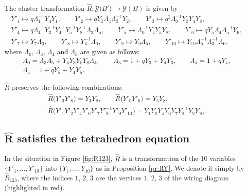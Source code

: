 \begin{Proposition}\label{pr:RY}
The cluster transformation $\widehat{R}\colon \mathcal{Y}\bigl(B'\bigr) \rightarrow \mathcal{Y}(B)$ is given by
\begin{gather*}
Y'_1 \mapsto q\Lambda^{-1}_4Y_4Y_1,\qquad
Y'_2 \mapsto qY_3\Lambda_4\Lambda^{-1}_3Y_2,
\qquad
Y'_3 \mapsto q^2 \Lambda^{-1}_0Y_3Y_4Y_8,
\\
Y'_4 \mapsto q\Lambda^{-1}_4Y^{-1}_3Y^{-1}_4Y^{-1}_5Y^{-1}_8\Lambda_3\Lambda_5,
\qquad
Y'_5 \mapsto \Lambda^{-1}_0 Y_4Y_5Y_8,
\qquad
Y'_6 \mapsto q Y_5 \Lambda_4\Lambda^{-1}_5Y_6,
\\
Y'_7 \mapsto Y_7\Lambda_3,
\qquad
Y'_8 \mapsto Y^{-1}_4\Lambda_0,
\qquad
Y'_9 \mapsto Y_9\Lambda_5,
\qquad
Y'_{10} \mapsto Y_{10}\Lambda^{-1}_5\Lambda^{-1}_3\Lambda_0,
\end{gather*}
where $\Lambda_0$, $\Lambda_3$, $\Lambda_4$ and $\Lambda_5$ are given
as follows:
\begin{gather*}
\Lambda_0 = \Lambda_3\Lambda_5 + Y_4Y_3Y_5Y_8\Lambda_4,\qquad
\Lambda_3 = 1+qY_3+Y_4Y_3,\qquad
\Lambda_4 = 1 + q Y_4, \\
\Lambda_5 = 1+qY_5+Y_4Y_5.
\end{gather*}
\end{Proposition}

\begin{Remark}\label{re:c2}
$\widehat{R}$ preserves the following combinations:
\begin{gather*}
\widehat{R}\bigl(Y'_3Y'_8\bigr) = Y_3Y_8,
\qquad
\widehat{R}\bigl(Y'_5Y'_8\bigr) = Y_5Y_8,
\\
\widehat{R}\bigl(Y'_1Y'_2Y'_4Y'_6Y'_7Y'^{-1}_8Y'_9Y'_{10}\bigr) =
Y_1Y_2Y_4Y_6Y_7Y^{-1}_8Y_9Y_{10}.
\end{gather*}
\end{Remark}

\subsection[R satisfies the tetrahedron equation]{$\boldsymbol{\widehat{R}}$ satisfies the tetrahedron equation}

In the situation in Figure \ref{fig:R123}, $\widehat{R}$ is a
transformation of the 10 variables $\{Y'_1,\dotsc, Y'_{10}\}$ into
$\{Y_1,\dotsc, Y_{10}\}$ as in Proposition \ref{pr:RY}. We denote it
simply by $\widehat{R}_{123}$, where the indices $1$, $2$, $3$ are the
vertices $1$, $2$, $3$ of the wiring diagram (highlighted in red).

